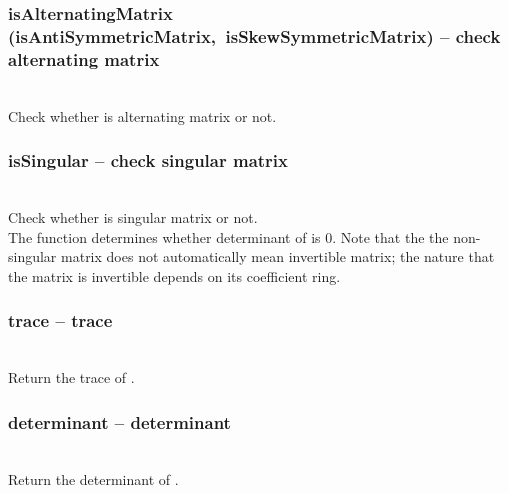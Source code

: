   \subsubsection{isAlternatingMatrix (isAntiSymmetricMatrix,\ isSkewSymmetricMatrix) -- check alternating matrix}
   \\
   \spacing
   \quad Check whether  is alternating matrix or not.\\
   \spacing
  \subsubsection{isSingular -- check singular matrix}
   \\
   \spacing
   \quad Check whether  is singular matrix or not.\\
   \spacing
   \quad The function determines whether determinant of  is $0$.
   Note that the the non-singular matrix does not automatically mean invertible matrix; the nature that the matrix is invertible depends on its coefficient ring.\\
   \spacing
  \subsubsection{trace -- trace}
   \\
   \spacing
   \quad Return the trace of .\\
   \spacing
  \subsubsection{determinant -- determinant}
   \\
   \spacing
   \quad Return the determinant of .\\
   \spacing
